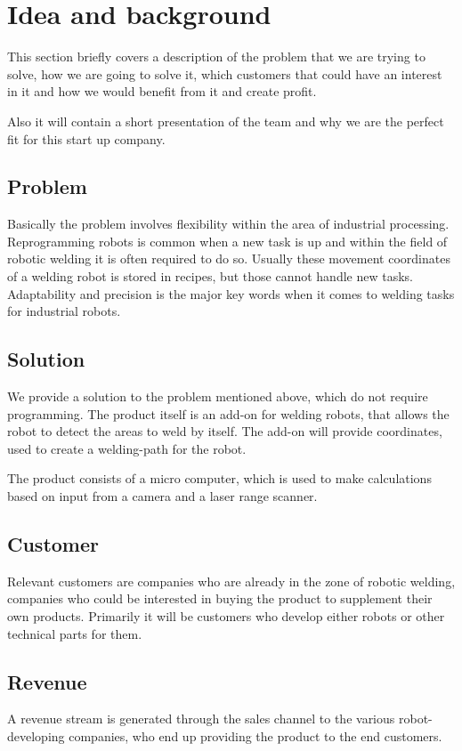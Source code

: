 

\section{Idea and background}
This section briefly covers a description of the problem that we are trying to solve, how we are going to solve it, which customers that could have an interest in it and how we would benefit from it and create profit.

Also it will contain a short presentation of the team and why we are the perfect fit for this start up company.

\subsection{Problem}
Basically the problem involves flexibility within the area of industrial processing. Reprogramming robots is common when a new task is up and within the field of robotic welding it is often required to do so. Usually these movement coordinates of a welding robot is stored in recipes, but those cannot handle new tasks. Adaptability and precision is the major key words when it comes to welding tasks for industrial robots.

\subsection{Solution}
We provide a solution to the problem mentioned above, which do not require programming. The product itself is an add-on for welding robots, that allows the robot to detect the areas to weld by itself. The add-on will provide coordinates, used to create a welding-path for the robot. 

The product consists of a micro computer, which is used to make  calculations based on input from a camera and a laser range scanner. 

\subsection{Customer}
Relevant customers are companies who are already in the zone of robotic welding, companies who could be interested in buying the product to supplement their own products. Primarily it will be customers who develop either robots or other technical parts for them.  

\subsection{Revenue}
A revenue stream is generated through the sales channel to the various robot-developing companies, who end up providing the product to the end customers.   

